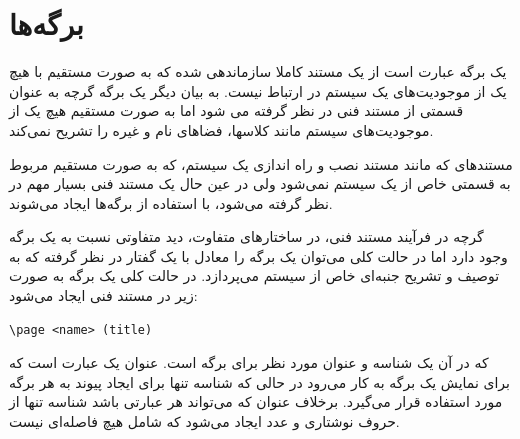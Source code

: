 %
% 
% 
% 
%
\section{برگه‌ها}

یک برگه عبارت است از یک مستند کاملا سازماندهی شده که به صورت مستقیم با هیچ یک از
موجودیت‌های یک سیستم در ارتباط نیست. به بیان دیگر یک برگه گرچه به عنوان قسمتی از
مستند فنی در نظر گرفته می شود اما به صورت مستقیم هیچ یک از موجودیت‌های سیستم
مانند کلاسها، فضاهای نام و غیره را تشریح نمی‌کند.

مستندهای که مانند مستند نصب و راه اندازی یک سیستم، که به صورت مستقیم مربوط به
قسمتی خاص از یک سیستم نمی‌شود ولی در عین حال یک مستند فنی بسیار مهم در نظر گرفته
می‌شود، با استفاده از برگه‌ها ایجاد می‌شوند.

گرچه در فرآیند مستند فنی، در ساختارهای متفاوت، دید متفاوتی نسبت به یک برگه وجود
دارد اما در حالت کلی می‌توان یک برگه را معادل با یک گفتار در نظر گرفته که به
توصیف و تشریح جنبه‌ای خاص از سیستم می‌پردازد. در حالت کلی یک برگه به صورت زیر در
مستند فنی ایجاد می‌شود:


\begin{latin}
\lstset{language=C++}  
\begin{lstlisting}[frame=single] 
\page <name> (title)
\end{lstlisting}
\end{latin}

که در آن  یک شناسه و  عنوان مورد نظر برای برگه است. عنوان
یک عبارت است که برای نمایش یک برگه به کار می‌رود در حالی که شناسه تنها برای
ایجاد پیوند به هر برگه مورد استفاده قرار می‌گیرد. برخلاف عنوان که می‌تواند هر
عبارتی باشد شناسه تنها از حروف نوشتاری و عدد ایجاد می‌شود که شامل هیچ فاصله‌ای
نیست.

